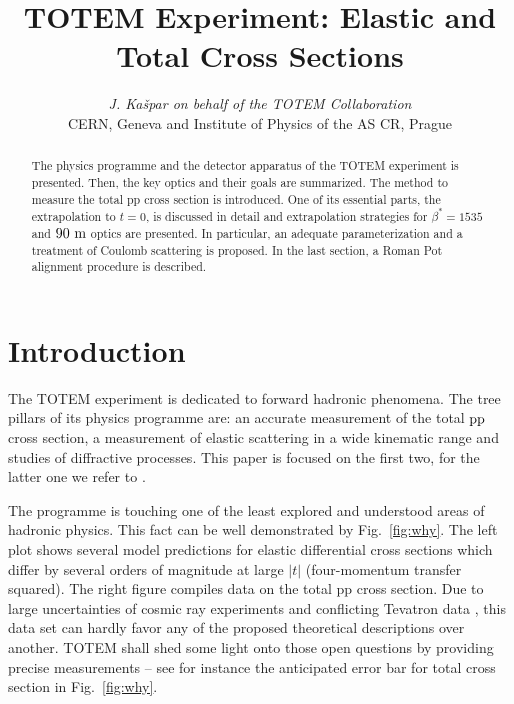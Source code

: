 \documentclass{desyproc}
\def\be{\beta}
\def\un#1{\ {\rm #1}}
\begin{document}
\title{TOTEM Experiment: Elastic and Total Cross Sections}

\author{{\slshape J. Ka\v spar on behalf of the TOTEM Collaboration}\\[1ex]
CERN, Geneva and Institute of Physics of the AS CR, Prague}


\doi  %

\maketitle

\begin{abstract}
The physics programme and the detector apparatus of the TOTEM experiment is presented. Then, the key optics and their goals are summarized. The method to measure the total pp cross section is introduced. One of its essential parts, the extrapolation to $t=0$, is discussed in detail and extrapolation strategies for $\be^*=1535$ and $90\un{m}$ optics are presented. In particular, an adequate parameterization and a treatment of Coulomb scattering is proposed. In the last section, a Roman Pot alignment procedure is described.
\end{abstract}

\vskip-9pt\vskip0pt
\section{Introduction}\label{sec:intro}

The TOTEM experiment \cite{tdr,jinst} is dedicated to forward hadronic phenomena. The tree pillars of its physics programme are: an accurate measurement of the total $\rm pp$ cross section, a measurement of elastic scattering in a wide kinematic range and studies of diffractive processes. This paper is focused on the first two, for the latter one we refer to \cite{tdr, jinst, simone}.

The programme is touching one of the least explored and understood areas of hadronic physics. This fact can be well demonstrated by Fig.~\ref{fig:why}. The left plot shows several model predictions for elastic differential cross sections which differ by several orders of magnitude at large $|t|$ (four-momentum transfer squared). The right figure compiles data on the total pp cross section. Due to large uncertainties of cosmic ray experiments and conflicting Tevatron data \cite{tevatron1,tevatron2}, this data set can hardly favor any of the proposed theoretical descriptions over another. TOTEM shall shed some light onto those open questions by providing precise measurements -- see for instance the anticipated error bar for total cross section in Fig.~\ref{fig:why}.
\end{document}
